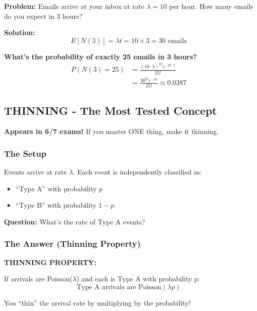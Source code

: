 \documentclass[10pt,letterpaper]{article}
\begin{document}
\begin{examplebox}
\textbf{Problem:} Emails arrive at your inbox at rate $\lambda = 10$ per hour. How many emails do you expect in 3 hours?

\textbf{Solution:}
\[
E[N(3)] = \lambda t = 10 \times 3 = \boxed{30 \text{ emails}}
\]

\textbf{What's the probability of exactly 25 emails in 3 hours?}
\begin{align*}
P(N(3) = 25) &= \frac{(10 \cdot 3)^{25} e^{-10 \cdot 3}}{25!} \\
&= \frac{30^{25} e^{-30}}{25!} \approx 0.0387
\end{align*}
\end{examplebox}

\subsection{THINNING - The Most Tested Concept}

\begin{criticalbox}
\textbf{Appears in 6/7 exams!} If you master ONE thing, make it thinning.
\end{criticalbox}

\subsubsection{The Setup}

Events arrive at rate $\lambda$. Each event is independently classified as:
\begin{itemize}
  \item ``Type A'' with probability $p$
  \item ``Type B'' with probability $1-p$
\end{itemize}

\textbf{Question:} What's the rate of Type A events?

\subsubsection{The Answer (Thinning Property)}

\begin{formulabox}[colback=yellow!20,colframe=orange!80]
\textbf{THINNING PROPERTY:}

If arrivals are Poisson($\lambda$) and each is Type A with probability $p$:
\[
\boxed{\text{Type A arrivals are Poisson}(\lambda p)}
\]

You ``thin'' the arrival rate by multiplying by the probability!
\end{formulabox}
\end{document}
